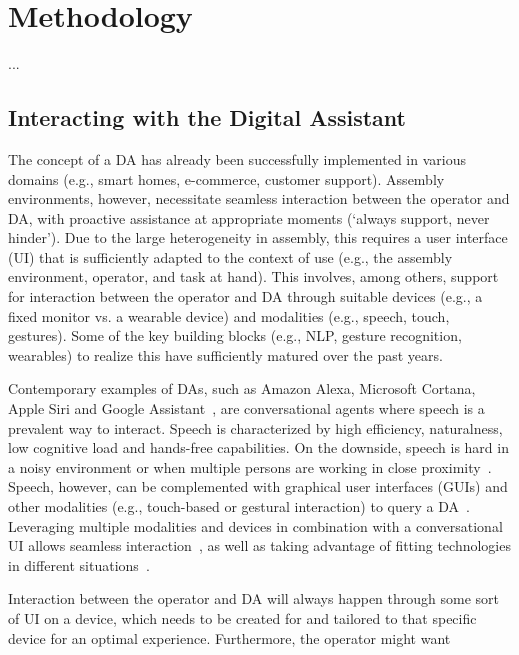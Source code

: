 \section{Methodology}\label{sec:Methodology}

...

\subsection{Interacting with the Digital Assistant}\label{sec:DA}
The concept of a DA has already been successfully implemented in various domains (e.g., smart homes, e-commerce, customer support). Assembly environments, however, necessitate seamless interaction between the operator and DA, with proactive assistance at appropriate moments (`always support, never hinder'). Due to the large heterogeneity in assembly, this requires a user interface (UI) that is sufficiently adapted to the context of use (e.g., the assembly environment, operator, and task at hand). This involves, among others, support for interaction between the operator and DA through suitable devices (e.g., a fixed monitor vs. a wearable device) and modalities (e.g., speech, touch, gestures). Some of the key building blocks (e.g., NLP, gesture recognition, wearables) to realize this have sufficiently matured over the past years.

Contemporary examples of DAs, such as Amazon Alexa, Microsoft Cortana, Apple Siri and Google Assistant~\cite{de2020intelligent}, are conversational agents where speech is a prevalent way to interact. Speech is characterized by high efficiency, naturalness, low cognitive load and hands-free capabilities. On the downside, speech is hard in a noisy environment or when multiple persons are working in close proximity~\cite{hou2018VisualFeedbackDesign}. Speech, however, can be complemented with graphical user interfaces (GUIs) and other modalities (e.g., touch-based or gestural interaction) to query a DA~\cite{belkadi2020IntelligentAssistantSystem,klopfenstein2017RiseBotsSurvey,heller2019TaskHerderWearableMinimal}. Leveraging multiple modalities and devices in combination with a conversational UI allows seamless interaction~\cite{white2019MultideviceDigitalAssistance}, as well as taking advantage of fitting technologies in different situations~\cite{heinz2018MultideviceAssistiveSystem}. 

Interaction between the operator and DA will always happen through some sort of UI on a device, which needs to be created for and tailored to that specific device for an optimal experience. Furthermore, the operator might want 


